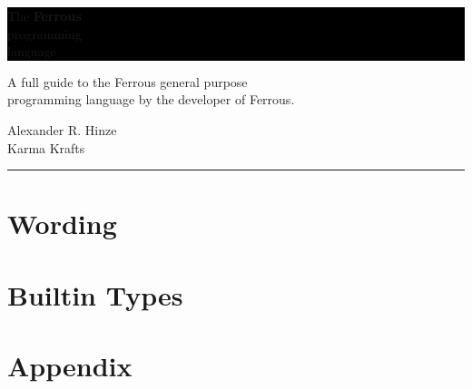\documentclass[11pt]{article}
\begin{document}
 \selectfont

\begin{titlepage}
    \colorbox{black}{
        \colorbox{primary_color}{
            \parbox[t]{0.93 \textwidth}{ %
                \parbox[t]{0.91 \textwidth}{ %
                    \raggedleft %
                    \fontsize{50pt}{80pt} \selectfont %
                    \vspace{0.7cm} %

                    The \textbf{Ferrous}\\
                    programming\\
                    language\\

                    \vspace{0.7cm} %
                }
            }
        }
    }

    \begin{center}
        \fontsize{16}{0} \selectfont
        A full guide to the Ferrous general purpose\\
        programming language by the developer of Ferrous.
        \normalfont \selectfont
    \end{center}

    \vfill %

    \parbox[t]{0.93 \textwidth}{ %
        \raggedleft %
        \large %
        {\Large Alexander R. Hinze}\\[4pt] %
        Karma Krafts

        \hfill \rule {0.2 \linewidth}{1pt} %
    }
\end{titlepage}

\tableofcontents \newpage

\section{Wording} \label{sec:wording}

\newpage

\section{Builtin Types} \label{sec:builtin_types}

\newpage

\section{Appendix} \label{sec:appendix}

\end{document}
